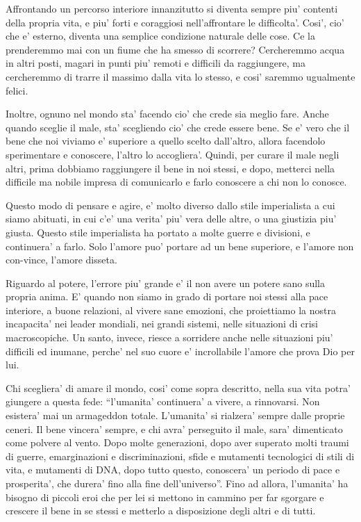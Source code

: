 Affrontando un percorso interiore innanzitutto si diventa sempre piu' contenti della propria vita, e piu' forti e coraggiosi nell'affrontare le difficolta'. Cosi', cio' che e' esterno, diventa una semplice condizione naturale delle cose. Ce la prenderemmo mai con un fiume che ha smesso di scorrere? Cercheremmo acqua in altri posti, magari in punti piu' remoti e difficili da raggiungere, ma cercheremmo di trarre il massimo dalla vita lo stesso, e cosi' saremmo ugualmente felici. 

Inoltre, ognuno nel mondo sta' facendo cio' che crede sia meglio fare. Anche quando sceglie il male, sta' scegliendo cio' che crede essere bene. Se e' vero che il bene che noi viviamo e' superiore a quello scelto dall'altro, allora facendolo sperimentare e conoscere, l'altro lo accogliera'.
Quindi, per curare il male negli altri, prima dobbiamo raggiungere il bene in noi stessi, e dopo, metterci nella difficile ma nobile impresa di comunicarlo e farlo conoscere a chi non lo conosce.

Questo modo di pensare e agire, e' molto diverso dallo stile imperialista a cui siamo abituati, in cui c'e' una verita' piu' vera delle altre, o una giustizia piu' giusta. Questo stile imperialista ha portato a molte guerre e divisioni, e continuera' a farlo. Solo l'amore puo' portare ad un bene superiore, e l'amore non con-vince, l'amore disseta.

Riguardo al potere, l'errore piu' grande e' il non avere un potere sano sulla propria anima. E' quando non siamo in grado di portare noi stessi alla pace interiore, a buone relazioni, al vivere sane emozioni, che proiettiamo la nostra incapacita' nei leader mondiali, nei grandi sistemi, nelle situazioni di crisi macroscopiche. Un santo, invece, riesce a sorridere anche nelle situazioni piu' difficili ed inumane, perche' nel suo cuore e' incrollabile l'amore che prova Dio per lui.

Chi scegliera' di amare il mondo, cosi' come sopra descritto, nella sua vita potra' giungere a questa fede: ``l'umanita' continuera' a vivere, a rinnovarsi. Non esistera' mai un armageddon totale. L'umanita' si rialzera' sempre dalle proprie ceneri. Il bene vincera' sempre, e chi avra' perseguito il male, sara' dimenticato come polvere al vento. Dopo molte generazioni, dopo aver superato molti traumi di guerre, emarginazioni e discriminazioni, sfide e mutamenti tecnologici di stili di vita, e mutamenti di DNA, dopo tutto questo, conoscera' un periodo di pace e prosperita', che durera' fino alla fine dell'universo''. Fino ad allora, l'umanita' ha bisogno di piccoli eroi che per lei si mettono in cammino per far sgorgare e crescere il bene in se stessi e metterlo a disposizione degli altri e di tutti.

